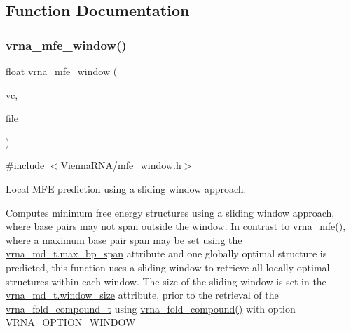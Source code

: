\subsection{Function Documentation}
\mbox{\label{group__mfe__window_ga689df235a1915a1ad56e377383c044ce}} 
\subsubsection{\texorpdfstring{vrna\_mfe\_window()}{vrna\_mfe\_window()}}
{\footnotesize\ttfamily float vrna\+\_\+mfe\+\_\+window (\begin{DoxyParamCaption}\item[{\mbox{\hyperlink{group__fold__compound_ga1b0cef17fd40466cef5968eaeeff6166}{vrna\+\_\+fold\+\_\+compound\+\_\+t}} $\ast$}]{vc,  }\item[{F\+I\+LE $\ast$}]{file }\end{DoxyParamCaption})}



{\ttfamily \#include $<$\mbox{\hyperlink{mfe__window_8h}{Vienna\+R\+N\+A/mfe\+\_\+window.\+h}}$>$}



Local M\+FE prediction using a sliding window approach. 

Computes minimum free energy structures using a sliding window approach, where base pairs may not span outside the window. In contrast to \mbox{\hyperlink{group__mfe__global_gabd3b147371ccf25c577f88bbbaf159fd}{vrna\+\_\+mfe()}}, where a maximum base pair span may be set using the \mbox{\hyperlink{group__model__details_a659e5fcc6e8c9f1a68e7de6548eef3b0}{vrna\+\_\+md\+\_\+t.\+max\+\_\+bp\+\_\+span}} attribute and one globally optimal structure is predicted, this function uses a sliding window to retrieve all locally optimal structures within each window. The size of the sliding window is set in the \mbox{\hyperlink{group__model__details_abea42f9229f8d8d6bcbedef316315bfc}{vrna\+\_\+md\+\_\+t.\+window\+\_\+size}} attribute, prior to the retrieval of the \mbox{\hyperlink{group__fold__compound_ga1b0cef17fd40466cef5968eaeeff6166}{vrna\+\_\+fold\+\_\+compound\+\_\+t}} using \mbox{\hyperlink{group__fold__compound_ga6601d994ba32b11511b36f68b08403be}{vrna\+\_\+fold\+\_\+compound()}} with option \mbox{\hyperlink{group__fold__compound_ga2b2a8009ccdccc3eb1571556261aee8e}{V\+R\+N\+A\+\_\+\+O\+P\+T\+I\+O\+N\+\_\+\+W\+I\+N\+D\+OW}}


